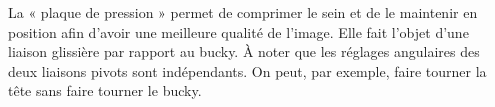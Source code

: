 La « plaque de pression » permet de comprimer le sein et de le maintenir en
position afin d’avoir une meilleure qualité de l’image. Elle fait l’objet d’une
liaison glissière par rapport au bucky.
À noter que les réglages angulaires des deux liaisons
pivots sont indépendants. On peut, par exemple, faire
tourner la tête sans faire tourner le bucky.
%


%
\fi

\fi

